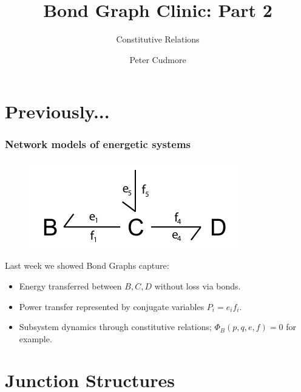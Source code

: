 \documentclass[11pt,reqno]{beamer}
\title{Bond Graph Clinic: Part 2}
\subtitle{Constitutive Relations}
\author{Peter Cudmore}
\institute{Systems Biology Lab, The University of Melbourne}
\begin{document}
	\begin{frame}
	\titlepage
	\addtocounter{framenumber}{-1} 
\end{frame}
\begin{frame}
\tableofcontents[hideallsubsections]
\end{frame}
\section{Previously...}
\begin{frame}
\frametitle{Network models of energetic systems}
	\begin{figure}
	\includegraphics{images/bondgraph.pdf}
\end{figure}
Last week we showed Bond Graphs capture:
\begin{itemize}
	\item Energy transferred between $B,C,D$ without loss via bonds.
	\item Power transfer represented by conjugate variables $P_i=e_if_i$.
	\item Subsystem dynamics through constitutive relations; $\Phi_B(p,q,e,f) = 0$ for example.
\end{itemize}
\end{frame}
\section{Junction Structures}
\end{document}
